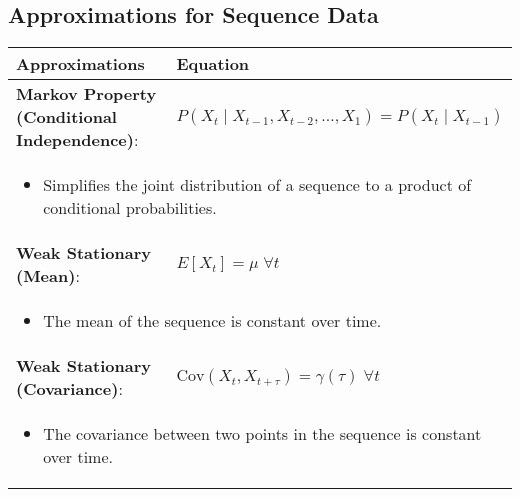 \subsection{Approximations for Sequence Data}
\begin{summary}
    \begin{center}
        \begin{tabular}{ll}
            \toprule
            \textbf{Approximations} & \textbf{Equation} \\
            \toprule
            \textbf{Markov Property (Conditional Independence)}: & $P(X_t \mid X_{t-1},X_{t-2},\ldots,X_1) = P(X_t \mid X_{t-1})$ \\
            \multicolumn{2}{p{\linewidth}}{
            \begin{itemize}
                \item Simplifies the joint distribution of a sequence to a product of conditional probabilities.
            \end{itemize}} \\
            \midrule
            \textbf{Weak Stationary (Mean)}: & $E[X_t] = \mu \; \forall t$ \\
            \multicolumn{2}{p{\linewidth}}{
            \begin{itemize}
                \item The mean of the sequence is constant over time.
            \end{itemize}} \\
            \midrule
            \textbf{Weak Stationary (Covariance)}: & $\text{Cov}(X_t,X_{t+\tau}) = \gamma(\tau) \; \forall t$ \\
            \multicolumn{2}{p{\linewidth}}{
            \begin{itemize}
                \item The covariance between two points in the sequence is constant over time.
            \end{itemize}} \\
            \bottomrule
        \end{tabular}
    \end{center}
\end{summary}
 